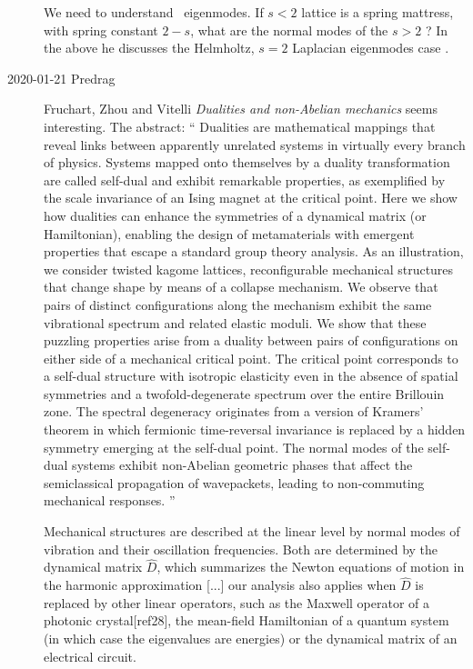 \begin{description}
We need to understand \catlatt\ eigenmodes. If $s<2$ lattice is a spring
mattress, with spring constant $2-s$, what are the normal modes of the
$s>2$ \catlatt?
In the above he discusses the Helmholtz, $s=2$ Laplacian eigenmodes
case .

\item[2020-01-21 Predrag]
Fruchart, Zhou and Vitelli
{\em Dualities and non-{Abelian} mechanics} seems interesting.
The abstract:
``
Dualities are mathematical mappings that reveal links between apparently
unrelated systems in virtually every branch of physics.
Systems mapped onto themselves by a duality transformation are called
self-dual and exhibit remarkable properties, as exemplified by the scale
invariance of an Ising magnet at the critical point. Here we show how
dualities can enhance the symmetries of a dynamical matrix (or
Hamiltonian), enabling the design of metamaterials with emergent
properties that escape a standard group theory analysis. As an
illustration, we consider twisted kagome lattices,
reconfigurable mechanical structures that change shape by means of a
collapse mechanism. We observe that pairs of distinct configurations
along the mechanism exhibit the same vibrational spectrum and related
elastic moduli. We show that these puzzling properties arise from a
duality between pairs of configurations on either side of a mechanical
critical point. The critical point corresponds to a self-dual structure
with isotropic elasticity even in the absence of spatial symmetries and a
twofold-degenerate spectrum over the entire Brillouin zone. The spectral
degeneracy originates from a version of Kramers' theorem in which
fermionic time-reversal invariance is replaced by a hidden symmetry
emerging at the self-dual point. The normal modes of the self-dual
systems exhibit non-Abelian geometric phases that affect the
semiclassical propagation of wavepackets, leading to non-commuting
mechanical responses.
''

Mechanical structures are described at the linear level by normal modes
of vibration and their oscillation frequencies. Both are determined by
the dynamical matrix $\hat{D}$, which summarizes the Newton equations of motion
in the harmonic approximation [...] our analysis also applies
when $\hat{D}$ is replaced by other linear operators, such as the Maxwell
operator of a photonic crystal[ref28], the mean-field Hamiltonian of a quantum
system (in which case the eigenvalues are energies) or the dynamical
matrix of an electrical circuit.


\end{description}
